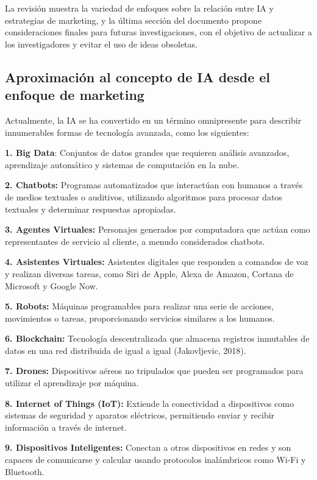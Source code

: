 \documentclass[a4paper, 12pt, twocolumn]{article}
\begin{document}
La revisión muestra la variedad de enfoques sobre la relación entre IA y estrategias de marketing, y la última sección del documento propone consideraciones finales para futuras investigaciones, con el objetivo de actualizar a los investigadores y evitar el uso de ideas obsoletas.

\subsection{Aproximación al concepto de IA desde el enfoque de marketing}

Actualmente, la IA se ha convertido en un término omnipresente para describir innumerables formas de tecnología avanzada, como los siguientes: 

\textbf{1. Big Data}: Conjuntos de datos grandes que requieren análisis avanzados, aprendizaje automático y sistemas de computación en la nube.

\textbf{2. Chatbots:} Programas automatizados que interactúan con humanos a través de medios textuales o auditivos, utilizando algoritmos para procesar datos textuales y determinar respuestas apropiadas.

\textbf{3. Agentes Virtuales:} Personajes generados por computadora que actúan como representantes de servicio al cliente, a menudo considerados chatbots.

\textbf{4. Asistentes Virtuales: }Asistentes digitales que responden a comandos de voz y realizan diversas tareas, como Siri de Apple, Alexa de Amazon, Cortana de Microsoft y Google Now.

\textbf{5. Robots:} Máquinas programables para realizar una serie de acciones, movimientos o tareas, proporcionando servicios similares a los humanos.

\textbf{6. Blockchain:} Tecnología descentralizada que almacena registros inmutables de datos en una red distribuida de igual a igual (Jakovljevic, 2018).

\textbf{7. Drones:} Dispositivos aéreos no tripulados que pueden ser programados para utilizar el aprendizaje por máquina.

\textbf{8. Internet of Things (IoT):} Extiende la conectividad a dispositivos como sistemas de seguridad y aparatos eléctricos, permitiendo enviar y recibir información a través de internet.\textbf{}

\textbf{9. Dispositivos Inteligentes:} Conectan a otros dispositivos en redes y son capaces de comunicarse y calcular usando protocolos inalámbricos como Wi-Fi y Bluetooth.
\end{document}
